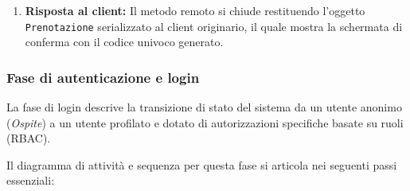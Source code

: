 \documentclass[12pt, a4paper]{article}
\begin{document}
\begin{enumerate}
    \item \textbf{Risposta al client:} Il metodo remoto si chiude restituendo l'oggetto \texttt{Prenotazione} serializzato al client originario, il quale mostra la schermata di conferma con il codice univoco generato.
\end{enumerate}

\subsubsection{Fase di autenticazione e login}
La fase di login descrive la transizione di stato del sistema da un utente anonimo (\textit{Ospite}) a un utente profilato e dotato di autorizzazioni specifiche basate su ruoli (RBAC).

Il diagramma di attività e sequenza per questa fase si articola nei seguenti passi essenziali:
\end{document}
